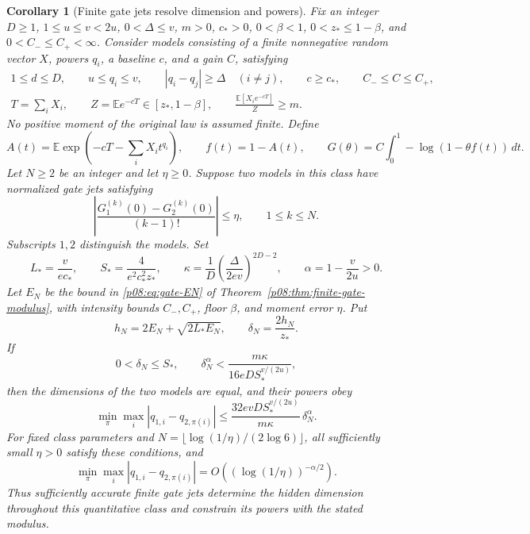 \documentclass[11pt,letterpaper]{article}
\newtheorem{corollary}[theorem]{Corollary}
\theoremstyle{definition}
\theoremstyle{remark}
\newcommand{\1}{\mathbf 1}
\begin{document}
\begin{corollary}[Finite gate jets resolve dimension and powers]
\label{p08:cor:gate-finite-structure}
Fix an integer $D\geq1$, $1\leq u\leq v<2u$, $0<\Delta\leq v$, $m>0$,
$c_* >0$, $0<\beta<1$, $0<z_*\leq1-\beta$, and $0<C_-\leq C_+<\infty$.
Consider models consisting of a finite nonnegative random vector $X$,
powers $q_i$, a baseline $c$, and a gain $C$, satisfying
\begin{gather}
 1\leq d\leq D,\qquad u\leq q_i\leq v,\qquad
 |q_i-q_j|\geq\Delta\quad(i\ne j),\qquad
 c\geq c_*,\qquad C_-\leq C\leq C_+,\label{p08:eq:jet-structure-class}\\
 T=\sum_iX_i,\qquad Z=\mathbb E e^{-cT}\in[z_*,1-\beta],\qquad
 \frac{\mathbb E[X_i e^{-cT}]}{Z}\geq m.\label{p08:eq:jet-tilted-class}
\end{gather}
No positive moment of the original law is assumed finite.  Define
\[
 A(t)=\mathbb E\exp\left(-cT-\sum_iX_it^{q_i}\right),\qquad
 f(t)=1-A(t),\qquad
 G(\theta)=C\int_0^1-\log(1-\theta f(t))\,dt.
\]
Let $N\geq2$ be an integer and let $\eta\geq0$. Suppose two models in this class have
normalized gate jets satisfying
\begin{equation}\label{p08:eq:jet-pair-data}
 \left|\frac{G_1^{(k)}(0)-G_2^{(k)}(0)}{(k-1)!}\right|\leq\eta,
 \qquad 1\leq k\leq N.
\end{equation}
Subscripts $1,2$ distinguish the models.  Set
\[
 L_* =\frac{v}{ec_*},\qquad S_* =\frac{4}{e^2c_*^2z_*},\qquad
 \kappa=\frac1D\left(\frac{\Delta}{2ev}\right)^{2D-2},\qquad
 \alpha=1-\frac{v}{2u}>0.
\]
Let $E_N$ be the bound in \eqref{p08:eq:gate-EN} of
Theorem~\ref{p08:thm:finite-gate-modulus}, with intensity bounds $C_-,C_+$,
floor $\beta$, and moment error $\eta$.
Put
\begin{equation}\label{p08:eq:jet-profile-error}
 h_N=2E_N+\sqrt{2L_*E_N},\qquad \delta_N=\frac{2h_N}{z_*}.
\end{equation}
If
\begin{equation}\label{p08:eq:jet-structure-threshold}
 0<\delta_N\leq S_*,\qquad
 \delta_N^\alpha<\frac{m\kappa}{16eD S_*^{v/(2u)}},
\end{equation}
then the dimensions of the two models are equal, and their powers obey
\begin{equation}\label{p08:eq:jet-power-resolution}
 \min_\pi\max_i|q_{1,i}-q_{2,\pi(i)}|
 \leq\frac{32evD S_*^{v/(2u)}}{m\kappa}\,\delta_N^\alpha.
\end{equation}
For fixed class parameters and
$N=\lfloor\log(1/\eta)/(2\log6)\rfloor$, all sufficiently small
$\eta>0$ satisfy these conditions, and
\begin{equation}\label{p08:eq:jet-log-rate}
 \min_\pi\max_i|q_{1,i}-q_{2,\pi(i)}|
 =O\left((\log(1/\eta))^{-\alpha/2}\right).
\end{equation}
Thus sufficiently accurate finite gate jets determine the hidden dimension
throughout this quantitative class and constrain its powers with the
stated modulus.
\end{corollary}
\end{document}
